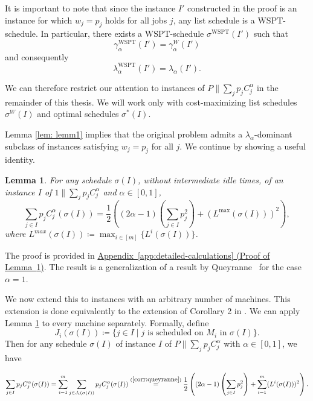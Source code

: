 \documentclass[%
english, titlepage=false %
]{./tum-templates/book/tumbook}
\newtheorem{lemma}{Lemma}
\newcommand{\Problem}{P\!\parallel\!\sum_j p_j C^{\alpha}_j}
\newcommand{\machLoad}{L^{i}(\sigma(I))}
\newcommand{\machLoadMax}{L^{\max}(\sigma(I))}
\begin{document}
It is important to note that since the instance $I'$ constructed in the proof is 
an instance for which $w_j=p_j$ holds for all jobs $j$, any list schedule is a $\mathrm{WSPT}$-schedule.
In particular, there exists a $\mathrm{WSPT}$-schedule $\sigma^{\mathrm{WSPT}}(I')$ such that
\[
    \gamma_{\alpha}^{\mathrm{WSPT}}(I') = \gamma^{W}_{\alpha}(I')
\]
and consequently
\[
    \lambda^{\mathrm{WSPT}}_{\alpha}(I') = \lambda_{\alpha}(I').
\]

We can therefore restrict our attention to instances of $\Problem$ in the remainder of this thesis.
We will work only with cost-maximizing list schedules $\sigma^{W}(I)$ and optimal schedules $\sigma^{*}(I)$.

Lemma \ref{lem: lemm1} implies that the original problem admits a $\lambda_{\alpha}$-dominant subclass of instances satisfying $w_j=p_j$ for all $j$. 
We continue by showing a useful identity.

\begin{lemma}\label{corr:queyranne}
For any schedule $\sigma(I)$, without intermediate idle times, of an instance $I$ of $1\!\parallel\!\sum_{j} p_j C_j^{\alpha}$ and $\alpha \in [0,1]$,
\[
        \sum_{j\in I}p_j C_j^{\alpha}(\sigma(I))
        =
        \frac12\left((2\alpha-1)\left(\sum_{j\in I}p_j^2\right)+(\machLoadMax)^2\right),
\]
where $L^{max}(\sigma(I)) \coloneqq \max_{i \in [m]} \{ L^{i}(\sigma(I))\}$.
\end{lemma}

\noindent
The proof is provided in
\hyperref[app:proof-queyranne]
{Appendix~\ref*{app:detailed-calculations}
(Proof of Lemma~\ref*{corr:queyranne})}.
The result is a generalization of a result by Queyranne~\cite{queyranne1993structure} for the case $\alpha=1$.

We now extend this to instances with an arbitrary number of machines.
This extension is done equivalently to the extension of Corollary 2 in \cite{Schwiegelshohn:2011}.
We can apply Lemma \ref{corr:queyranne} to every machine separately.
Formally, define
\[
J_i(\sigma(I))
\coloneqq
\{j\in I\mid j\text{ is scheduled on }M_i\text{ in }\sigma(I)\}.
\]
Then for any schedule $\sigma(I)$ of instance $I$ of $\Problem$ with $\alpha \in [0,1]$, we have

\[
        \sum_{j\in I}p_j C^{\alpha}_j(\sigma(I))
        =
        \sum_{i=1}^m \sum_{j\in J_i(\sigma(I))}p_j C^{\alpha}_j(\sigma(I))
        \overset{(\ref{corr:queyranne})}{=}
        \frac12\left((2\alpha-1)\left(\sum_{j\in I}p_j^2\right)+\sum_{i=1}^m (\machLoad)^2\right).
\]
\end{document}
